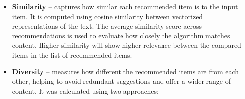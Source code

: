 \documentclass[\myFontSize,a4paper,oneside,hidelinks]{article}
\begin{document}
\begin{itemize}
    \item \textbf{Similarity} – captures how similar each recommended item is to the input item. It is computed using cosine similarity between vectorized representations of the text. The average similarity score across recommendations is used to evaluate how closely the algorithm matches content. Higher similarity will show higher relevance between the compared items in the list of recommended items.

%
%
%
%


	\item \textbf{Diversity} – measures how different the recommended items are from each other, helping to avoid redundant suggestions and offer a wider range of content. It was calculated using two approaches:


\end{itemize}
\end{document}
